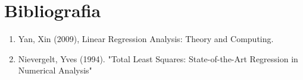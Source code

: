 \section{Bibliografia}

\begin{enumerate}
    \item Yan, Xin (2009), Linear Regression Analysis: Theory and Computing.
    \item Nievergelt, Yves (1994). "Total Least Squares: State-of-the-Art Regression in Numerical Analysis"
\end{enumerate}